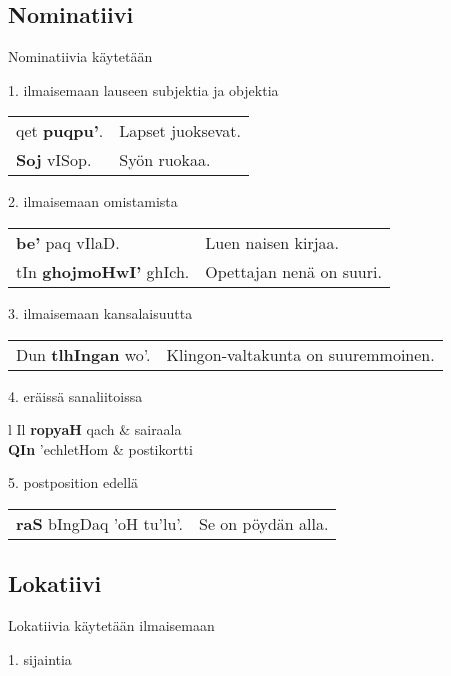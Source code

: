 \documentclass{book}
\begin{document}
\subsection{Nominatiivi}

Nominatiivia käytetään

1. ilmaisemaan lauseen subjektia ja objektia

\begin{tabular}{l l}
    qet \textbf{puqpu'}. & Lapset juoksevat. \\
    \textbf{Soj} vISop. & Syön ruokaa. \\
\end{tabular}

2. ilmaisemaan omistamista

\begin{tabular}{l l}
    \textbf{be'} paq vIlaD. & Luen naisen kirjaa. \\
    tIn \textbf{ghojmoHwI'} ghIch. & Opettajan nenä on suuri. \\
\end{tabular}

3. ilmaisemaan kansalaisuutta

\begin{tabular}{l l}
    Dun \textbf{tlhIngan} wo'. & Klingon-valtakunta on suuremmoinen. \\
\end{tabular}

4. eräissä sanaliitoissa

\begin{tabular}{l Il}
    \textbf{ropyaH} qach & sairaala \\
    \textbf{QIn} 'echletHom & postikortti \\
\end{tabular}

5. postposition edellä

\begin{tabular}{l l}
    \textbf{raS} bIngDaq 'oH tu'lu'. & Se on pöydän alla. \\
\end{tabular}

\subsection{Lokatiivi}

Lokatiivia käytetään ilmaisemaan

1. sijaintia
\end{document}
